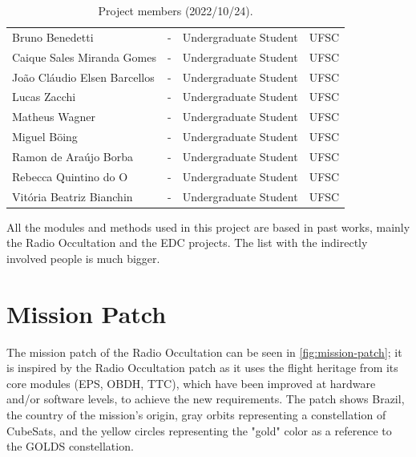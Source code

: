 \begin{table}[!htb]
\begin{tabular}{lllc}
        Bruno Benedetti                     & -         & Undergraduate Student & UFSC \\
        Caique Sales Miranda Gomes          & -         & Undergraduate Student & UFSC \\
        João Cláudio Elsen Barcellos        & -         & Undergraduate Student & UFSC \\
        Lucas Zacchi                        & -         & Undergraduate Student & UFSC \\
        Matheus Wagner                      & -         & Undergraduate Student & UFSC \\
        Miguel Böing                        & -         & Undergraduate Student & UFSC \\
        Ramon de Araújo Borba               & -         & Undergraduate Student & UFSC \\
        Rebecca Quintino do O               & -         & Undergraduate Student & UFSC \\
        Vitória Beatriz Bianchin            & -         & Undergraduate Student & UFSC \\
        \bottomrule[1.5pt]
    \end{tabular}
    \caption{Project members (2022/10/24).}
    \label{tab:team-members}
\end{table}

All the modules and methods used in this project are based in past works, mainly the Radio Occultation and the EDC projects. The list with the indirectly involved people is much bigger.

\section{Mission Patch}

The mission patch of the Radio Occultation can be seen in \autoref{fig:mission-patch}; it is inspired by the Radio Occultation patch \cite{floripasat} as it uses the flight heritage from its core modules (EPS, OBDH, TTC), which have been improved at hardware and/or software levels, to achieve the new requirements. The patch shows Brazil, the country of the mission's origin, gray orbits representing a constellation of CubeSats, and the yellow circles representing the "gold" color as a reference to the GOLDS constellation.

